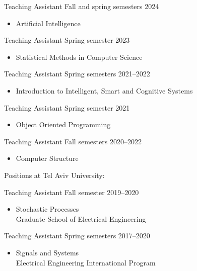 \documentclass[10pt]{article}
\newenvironment{innerlist}[1][\enskip\textbullet]%
        {\begin{itemize}[#1,leftmargin=*,parsep=0pt,itemsep=0pt,topsep=0pt,partopsep=0pt]}
        {\end{itemize}}
\newcommand{\halfblankline}{\quad\vspace{-0.5\baselineskip}\pagebreak[3]}
\begin{document}
Teaching Assistant \hfill {Fall and spring semesters 2024}
\begin{innerlist}
	
	\item[] Artificial Intelligence
\end{innerlist}

Teaching Assistant \hfill {Spring semester 2023}
\begin{innerlist}
	
	\item[] Statistical Methods in Computer Science
\end{innerlist}

Teaching Assistant \hfill {Spring semesters 2021--2022}
\begin{innerlist}
	
	\item[] Introduction to Intelligent, Smart and Cognitive Systems
\end{innerlist}

Teaching Assistant \hfill {Spring semester 2021}
\begin{innerlist}
	
	\item[] Object Oriented Programming
\end{innerlist}

Teaching Assistant \hfill {Fall semesters 2020--2022}
\begin{innerlist}
	
	\item[] Computer Structure
\end{innerlist}

\halfblankline

Positions at Tel Aviv University:

Teaching Assistant \hfill {Fall semester 2019--2020}
\begin{innerlist}
	
	\item[] Stochastic Processes \\
	Graduate School of Electrical Engineering
\end{innerlist}

Teaching Assistant \hfill {Spring semesters 2017--2020}
\begin{innerlist}
	
	\item[] Signals and Systems  \\
	Electrical Engineering International Program
\end{innerlist}
\end{document}
